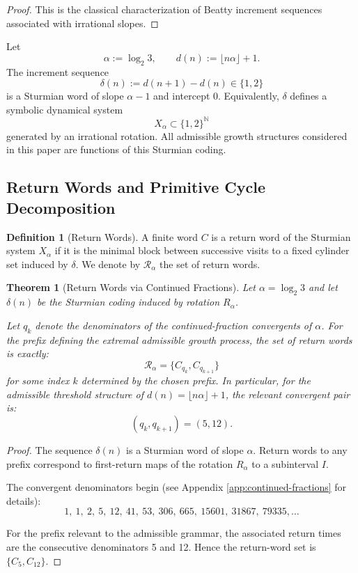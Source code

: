\documentclass[12pt, oneside]{article}
\numberwithin{equation}{section}
\theoremstyle{definition}
\newtheorem{definition}{Definition}[section]
\theoremstyle{plain}
\newtheorem{theorem}{Theorem}[section]
\theoremstyle{remark}
\begin{document}
\begin{proof}
This is the classical characterization of Beatty increment sequences
associated with irrational slopes.
\end{proof}

Let
\[
\alpha := \log_2 3,
\qquad
d(n) := \lfloor n\alpha \rfloor + 1.
\]
The increment sequence
\[
\delta(n) := d(n+1) - d(n) \in \{1,2\}
\]
is a Sturmian word of slope $\alpha - 1$ and intercept $0$.
Equivalently, $\delta$ defines a symbolic dynamical system
\[
X_\alpha \subset \{1,2\}^{\mathbb{N}}
\]
generated by an irrational rotation. All admissible growth structures
considered in this paper are functions of this Sturmian coding.

\subsection{Return Words and Primitive Cycle Decomposition}

\begin{definition}[Return Words]
A finite word $C$ is a return word of the Sturmian system $X_\alpha$ if it is
the minimal block between successive visits to a fixed cylinder set induced by
$\delta$. We denote by $\mathcal{R}_\alpha$ the set of return words.
\end{definition}

\begin{theorem}[Return Words via Continued Fractions]
Let $\alpha = \log_2 3$ and let $\delta(n)$ be the Sturmian coding induced
by rotation $R_\alpha$.

Let $q_k$ denote the denominators of the continued-fraction convergents of $\alpha$.
For the prefix defining the extremal admissible growth process, the set of return
words is exactly:
\[
\mathcal{R}_\alpha = \{C_{q_k}, C_{q_{k+1}}\}
\]
for some index $k$ determined by the chosen prefix.  In particular, for the admissible
threshold structure of $d(n)=\lfloor n\alpha \rfloor +1$, the relevant convergent pair is:
\[
(q_k, q_{k+1}) = (5,12).
\]
\end{theorem}

\begin{proof}
The sequence $\delta(n)$ is a Sturmian word of slope $\alpha$.
Return words to any prefix correspond to first-return maps of the rotation
$R_\alpha$ to a subinterval $I$.

The convergent denominators begin (see Appendix \ref{app:continued-fractions} for details):
\[
1,\ 1,\ 2,\ 5,\ 12,\ 41,\ 53,\ 306,\ 665,\ 15601,\ 31867,\ 79335,\ldots
\]

For the prefix relevant to the admissible grammar, the associated return times are the
consecutive denominators 5 and 12. Hence the return-word set is $\{C_5, C_{12}\}$.
\end{proof}
\end{document}
